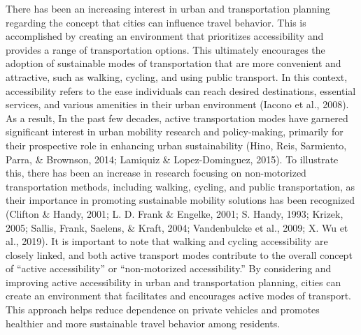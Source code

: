 \documentclass[
11pt, %
oneside, %
english, %
singlespacing, %
]{macthesis} %
\begin{document}
There has been an increasing interest in urban and transportation planning regarding the concept that cities can influence travel behavior. This is accomplished by creating an environment that prioritizes accessibility and provides a range of transportation options. This ultimately encourages the adoption of sustainable modes of transportation that are more convenient and attractive, such as walking, cycling, and using public transport. In this context, accessibility refers to the ease individuals can reach desired destinations, essential services, and various amenities in their urban environment (Iacono et al., 2008). As a result, In the past few decades, active transportation modes have garnered significant interest in urban mobility research and policy-making, primarily for their prospective role in enhancing urban sustainability (Hino, Reis, Sarmiento, Parra, \& Brownson, 2014; Lamiquiz \& Lopez-Dominguez, 2015). To illustrate this, there has been an increase in research focusing on non-motorized transportation methods, including walking, cycling, and public transportation, as their importance in promoting sustainable mobility solutions has been recognized (Clifton \& Handy, 2001; L. D. Frank \& Engelke, 2001; S. Handy, 1993; Krizek, 2005; Sallis, Frank, Saelens, \& Kraft, 2004; Vandenbulcke et al., 2009; X. Wu et al., 2019). It is important to note that walking and cycling accessibility are closely linked, and both active transport modes contribute to the overall concept of ``active accessibility'' or ``non-motorized accessibility.'' By considering and improving active accessibility in urban and transportation planning, cities can create an environment that facilitates and encourages active modes of transport. This approach helps reduce dependence on private vehicles and promotes healthier and more sustainable travel behavior among residents.
\end{document}

